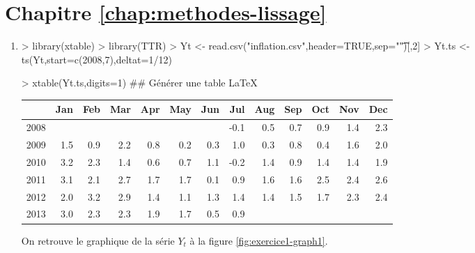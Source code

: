 \section*{Chapitre \ref{chap:methodes-lissage}}

\begin{solution}{1.1}
\begin{enumerate}
\item
\begin{Schunk}
\begin{Sinput}
> library(xtable)
> library(TTR)
> Yt <- read.csv("inflation.csv",header=TRUE,sep="\t")[,2]
> Yt.ts <-ts(Yt,start=c(2008,7),deltat=1/12)
\end{Sinput}
\end{Schunk}
\begin{Schunk}
\begin{Sinput}
> xtable(Yt.ts,digits=1) ## Générer une table LaTeX
\end{Sinput}
\begin{table}[ht]
\centering
\begin{tabular}{rrrrrrrrrrrrr}
  \hline
 & Jan & Feb & Mar & Apr & May & Jun & Jul & Aug & Sep & Oct & Nov & Dec \\
  \hline
2008 &  &  &  &  &  &  & -0.1 & 0.5 & 0.7 & 0.9 & 1.4 & 2.3 \\
  2009 & 1.5 & 0.9 & 2.2 & 0.8 & 0.2 & 0.3 & 1.0 & 0.3 & 0.8 & 0.4 & 1.6 & 2.0 \\
  2010 & 3.2 & 2.3 & 1.4 & 0.6 & 0.7 & 1.1 & -0.2 & 1.4 & 0.9 & 1.4 & 1.4 & 1.9 \\
  2011 & 3.1 & 2.1 & 2.7 & 1.7 & 1.7 & 0.1 & 0.9 & 1.6 & 1.6 & 2.5 & 2.4 & 2.6 \\
  2012 & 2.0 & 3.2 & 2.9 & 1.4 & 1.1 & 1.3 & 1.4 & 1.4 & 1.5 & 1.7 & 2.3 & 2.4 \\
  2013 & 3.0 & 2.3 & 2.3 & 1.9 & 1.7 & 0.5 & 0.9 &  &  &  &  &  \\
   \hline
\end{tabular}
\end{table}\end{Schunk}
On retrouve le graphique de la série $Y_t$ à la figure \ref{fig:exercice1-graph1}.
\begin{figure}[!ht]
\centering

\end{figure}
\end{enumerate}
\end{solution}
